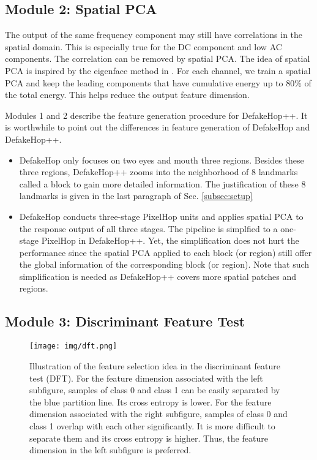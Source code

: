 \documentclass[main, biber]{now-journal}
\begin{document}
\subsection{Module 2: Spatial PCA}\label{sec:spatial_PCA}

The output of the same frequency component may still have correlations
in the spatial domain.  This is especially true for the DC component and
low AC components. The correlation can be removed by spatial PCA. The
idea of spatial PCA is inspired by the eigenface method in
\citep{turk1991eigenfaces}. For each channel, we train a spatial PCA and
keep the leading components that have cumulative energy up to 80\% of
the total energy. This helps reduce the output feature dimension. 

Modules 1 and 2 describe the feature generation procedure for
DefakeHop++.  It is worthwhile to point out the differences in feature
generation of DefakeHop and DefakeHop++. 
\begin{itemize}
\item DefakeHop only focuses on two eyes and mouth three regions.
Besides these three regions, DefakeHop++ zooms into the neighborhood of
8 landmarks called a block to gain more detailed information. The justification of
these 8 landmarks is given in the last paragraph of Sec. \ref{subsec:setup}
\item DefakeHop conducts three-stage PixelHop units and applies spatial
PCA to the response output of all three stages. The pipeline is
simplfied to a one-stage PixelHop in DefakeHop++. Yet, the
simplification does not hurt the performance since the spatial PCA
applied to each block (or region) still offer the global information of
the corresponding block (or region). Note that such simplification is
needed as DefakeHop++ covers more spatial patches and regions. 
\end{itemize}

\subsection{Module 3: Discriminant Feature Test}

\begin{figure}[!t]
\centering
\texttt{[image: img/dft.png]}
\caption{Illustration of the feature selection idea in the discriminant
feature test (DFT). For the feature dimension associated with the left
subfigure, samples of class 0 and class 1 can be easily separated by the
blue partition line. Its cross entropy is lower. For the feature
dimension associated with the right subfigure, samples of class 0 and
class 1 overlap with each other significantly. It is more difficult to
separate them and its cross entropy is higher. Thus, the feature
dimension in the left subfigure is preferred.}\label{fig_dft}
\end{figure}
\end{document}
